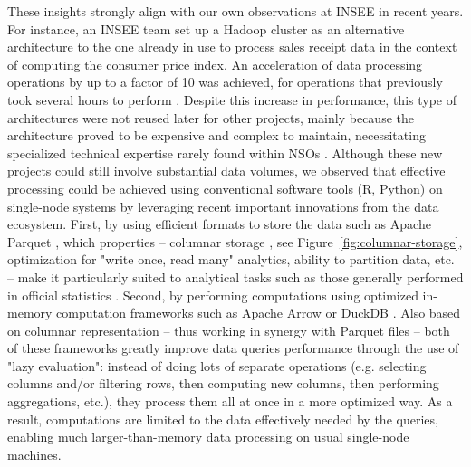\documentclass[graybox]{svmult}
\begin{document}
These insights strongly align with our own observations at INSEE in recent years. For instance, an INSEE team set up a Hadoop cluster as an alternative architecture to the one already in use to process sales receipt data in the context of computing the consumer price index. An acceleration of data processing operations by up to a factor of 10 was achieved, for operations that previously took several hours to perform \citep{leclair2019utiliser}. Despite this increase in performance, this type of architectures were not reused later for other projects, mainly because the architecture proved to be expensive and complex to maintain, necessitating specialized technical expertise rarely found within NSOs \citep{vale2015international}. Although these new projects could still involve substantial data volumes, we observed that effective processing could be achieved using conventional software tools (R, Python) on single-node systems by leveraging recent important innovations from the data ecosystem. First, by using efficient formats to store the data such as Apache Parquet \citep{parquet2013}, which properties -- columnar storage \citep{abadi2013design}, see Figure~\ref{fig:columnar-storage}, optimization for "write once, read many" analytics, ability to partition data, etc. -- make it particularly suited to analytical tasks such as those generally performed in official statistics \citep{abdelaziz2023optimizing}. Second, by performing computations using optimized in-memory computation frameworks such as Apache Arrow \citep{arrow2016} or DuckDB \citep{raasveldt2019duckdb}. Also based on columnar representation -- thus working in synergy with Parquet files -- both of these frameworks greatly improve data queries performance through the use of "lazy evaluation": instead of doing lots of separate operations (e.g. selecting columns and/or filtering rows, then computing new columns, then performing aggregations, etc.), they process them all at once in a more optimized way. As a result, computations are limited to the data effectively needed by the queries, enabling much larger-than-memory data processing on usual single-node machines.
\end{document}
